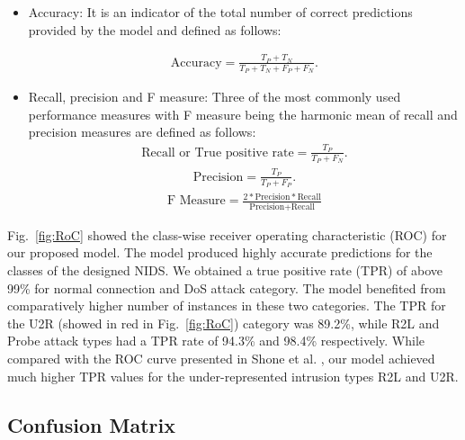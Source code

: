 \documentclass[runningheads]{llncs}
\newcommand{\fig}[1]{Fig.~\ref{#1}}
\begin{document}
\begin{itemize}
\item {Accuracy: It is an indicator of the total number of correct predictions provided by the model and defined as follows:

\begin{align}
\text{Accuracy} =\frac{T_P+T_N}{T_P+T_N+F_P+F_N}.
\end{align}
}
\item {Recall, precision and F measure: Three of the most commonly used performance measures with F measure being the harmonic mean of recall and precision measures are defined as follows:
\begin{align}
\text{Recall or True positive rate} =\frac{T_P}{T_P+F_N}.
\end{align}
\begin{align}
\text{Precision} =\frac{T_P}{T_P+F_P}.
\end{align}}
\begin{align}
{\text{F \ Measure}} =\frac{2*{\text{Precision}}*{\text{Recall}}}{\text{Precision+Recall}}
\end{align}

 
\end{itemize}
\fig{fig:RoC} showed the class-wise receiver operating characteristic (ROC) for our proposed model. The model produced highly accurate predictions for the classes of the designed NIDS. We obtained a true positive rate (TPR) of above 99\% for normal connection and DoS attack category. The model benefited from comparatively higher number of instances in these two categories. The TPR for the U2R (showed in red in \fig{fig:RoC}) category was 89.2\%, while R2L and Probe attack types had a TPR rate of 94.3\% and 98.4\% respectively. While compared with the ROC curve presented in Shone et al. \cite{Shone2018}, our model achieved much higher TPR values for the under-represented intrusion types R2L and U2R.




\subsection{Confusion Matrix}
\end{document}
